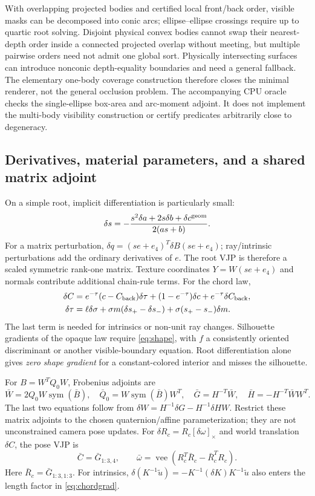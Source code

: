 \documentclass[10pt,letterpaper]{article}
\theoremstyle{remark}\newtheorem{counterexample}[proposition]{Counterexample}
\newcommand{\sym}{\operatorname{sym}}
\begin{document}
With overlapping projected bodies and certified local front/back order, visible masks can be decomposed into conic arcs; ellipse--ellipse crossings require up to quartic root solving. Disjoint physical convex bodies cannot swap their nearest-depth order inside a connected projected overlap without meeting, but multiple pairwise orders need not admit one global sort. Physically intersecting surfaces can introduce nonconic depth-equality boundaries and need a general fallback. The elementary one-body coverage construction therefore closes the minimal renderer, not the general occlusion problem. The accompanying CPU oracle checks the single-ellipse box-area and arc-moment adjoint. It does not implement the multi-body visibility construction or certify predicates arbitrarily close to degeneracy.

\subsection{Derivatives, material parameters, and a shared matrix adjoint}
On a simple root, implicit differentiation is particularly small:
\begin{equation}
 \delta s=-\frac{s^2\delta a+2s\delta b+\delta c^{\rm geom}}{2(as+b)}.
 \label{eq:rootgrad}
\end{equation}
For a matrix perturbation, $\delta q=(se+e_4)^T\delta B(se+e_4)$; ray/intrinsic perturbations add the ordinary derivatives of $e$. The root VJP is therefore a scaled symmetric rank-one matrix. Texture coordinates $Y=W(se+e_4)$ and normals contribute additional chain-rule terms. For the chord law,
\begin{align}
 \delta C&=e^{-\tau}(c-C_{\rm back})\delta\tau
 +(1-e^{-\tau})\delta c+e^{-\tau}\delta C_{\rm back},\\
 \delta\tau&=\ell\delta\sigma+\sigma m(\delta s_+-\delta s_-)
 +\sigma(s_+-s_-)\delta m. \label{eq:chordgrad}
\end{align}
The last term is needed for intrinsics or non-unit ray changes. Silhouette gradients of the opaque law require \eqref{eq:shape}, with $f$ a consistently oriented discriminant or another visible-boundary equation. Root differentiation alone gives \emph{zero shape gradient} for a constant-colored interior and misses the silhouette.

For $B=W^TQ_0W$, Frobenius adjoints are
\begin{equation}
 \bar W=2Q_0W\sym(\bar B),\quad
 \bar Q_0=W\sym(\bar B)W^T,\quad
 \bar G=H^{-T}\bar W,\quad
 \bar H=-H^{-T}\bar W W^T. \label{eq:congruenceadj}
\end{equation}
The last two equations follow from $\delta W=H^{-1}\delta G-H^{-1}\delta H W$. Restrict these matrix adjoints to the chosen quaternion/affine parameterization; they are not unconstrained camera pose updates. For $\delta R_c=R_c[\delta\omega]_\times$ and world translation $\delta C$, the pose VJP is
\begin{equation}
 \bar C=\bar G_{1:3,4},\qquad
 \bar\omega=\operatorname{vee}(R_c^T\bar R_c-\bar R_c^TR_c).
\end{equation}
Here $\bar R_c=\bar G_{1:3,1:3}$. For intrinsics, $\delta(K^{-1}\widetilde u)=-K^{-1}(\delta K)K^{-1}\widetilde u$ also enters the length factor in \eqref{eq:chordgrad}.
\end{document}
